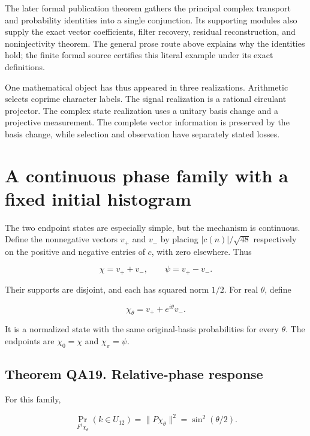 The later formal publication theorem gathers the principal complex
transport and probability identities into a single conjunction. Its
supporting modules also supply the exact vector coefficients, filter
recovery, residual reconstruction, and noninjectivity theorem. The
general prose route above explains why the identities hold; the finite
formal source certifies this literal example under its exact
definitions.

One mathematical object has thus appeared in three realizations.
Arithmetic selects coprime character labels. The signal realization is a
rational circulant projector. The complex state realization uses a
unitary basis change and a projective measurement. The complete vector
information is preserved by the basis change, while selection and
observation have separately stated losses.

\hypertarget{a-continuous-phase-family-with-a-fixed-initial-histogram}{%
\section{A continuous phase family with a fixed initial
histogram}\label{a-continuous-phase-family-with-a-fixed-initial-histogram}}

The two endpoint states are especially simple, but the mechanism is
continuous. Define the nonnegative vectors \(v_+\) and \(v_-\) by
placing \(|c(n)|/\sqrt{48}\) respectively on the positive and negative
entries of \(c\), with zero elsewhere. Thus

\[
\chi=v_++v_-,
\qquad \psi=v_+-v_-.
\]

Their supports are disjoint, and each has squared norm \(1/2\). For real
\(\theta\), define

\[
\chi_\theta=v_++e^{i\theta}v_-.
\]

It is a normalized state with the same original-basis probabilities for
every \(\theta\). The endpoints are \(\chi_0=\chi\) and
\(\chi_\pi=\psi\).

\hypertarget{theorem-qa19.-relative-phase-response}{%
\subsection*{Theorem QA19. Relative-phase
response}\label{theorem-qa19.-relative-phase-response}}

For this family,

\[
\boxed{\Pr_{F^\dagger\chi_\theta}(k\in U_{12})
=\|P\chi_\theta\|^2=\sin^2(\theta/2).}
\]


